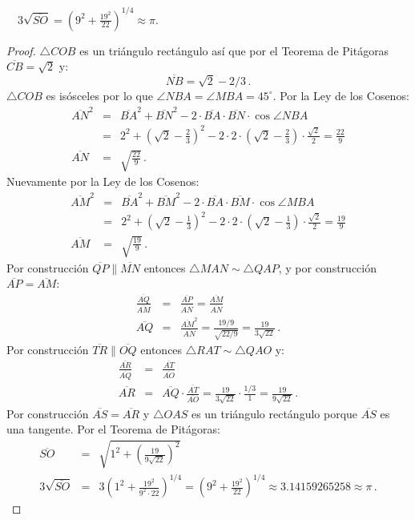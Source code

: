 \begin{theorem}\label{thm.ramanujan2}
$\quad 3\sqrt{\overline{SO}}=\left(9^2+\displaystyle\frac{19^2}{22}\right)^{1/4}\approx \pi$.
\end{theorem}
\begin{proof}
$\triangle COB$ es un triángulo rectángulo así que por el Teorema de Pitágoras $\overline{CB}=\sqrt{2}$ y:
\[
\overline{NB}=\sqrt{2}-2/3\,.
\]
$\triangle COB$ es isósceles por lo que $\angle NBA =\angle MBA=45^\circ$. Por la Ley de los Cosenos:
\begin{eqnarray*}
\overline{AN}^2&=&\overline{BA}^2 + \overline{BN}^2-2\cdot\overline{BA}\cdot\overline{BN}\cdot\cos \angle NBA\\
&=&2^2+\left(\sqrt{2}-\frac{2}{3}\right)^2-2\cdot 2 \cdot \left(\sqrt{2}-\frac{2}{3}\right)\cdot \frac{\sqrt{2}}{2}
=\frac{22}{9}\\
\overline{AN}&=&\sqrt{\frac{22}{9}}\,.
\end{eqnarray*}
Nuevamente por la Ley de los Cosenos:
\begin{eqnarray*}
\overline{AM}^2&=&\overline{BA}^2 + \overline{BM}^2-2\cdot\overline{BA}\cdot\overline{BM}\cdot\cos \angle MBA\\
&=&2^2+\left(\sqrt{2}-\frac{1}{3}\right)^2-2\cdot 2 \cdot \left(\sqrt{2}-\frac{1}{3}\right)\cdot \frac{\sqrt{2}}{2}
=\frac{19}{9}\\
\overline{AM}&=&\sqrt{\frac{19}{9}}\,.
\end{eqnarray*}
Por construcción $\overline{QP}\parallel \overline{MN}$ entonces
$\triangle MAN\sim \triangle QAP$, y por construcción $\overline{AP}=\overline{AM}$:
\begin{eqnarray*}
\frac{\overline{AQ}}{\overline{AM}}&=&\frac{\overline{AP}}{\overline{AN}}=\frac{\overline{AM}}{\overline{AN}}\\
\overline{AQ}&=&\frac{\overline{AM}^2}{\overline{AN}}=\frac{19/9}{\sqrt{22/9}}=\frac{19}{3\sqrt{22}}\,.
\end{eqnarray*}
Por construcción $\overline{TR}\parallel \overline{OQ}$ entonces
$\triangle RAT\sim \triangle QAO$ y:
\begin{eqnarray*}
\frac{\overline{AR}}{\overline{AQ}}&=&\frac{\overline{AT}}{\overline{AO}}\\
\overline{AR}&=&\overline{AQ}\cdot\frac{\overline{AT}}{\overline{AO}}=\frac{19}{3\sqrt{22}}\cdot\frac{1/3}{1}=\frac{19}{9\sqrt{22}}\,.
\end{eqnarray*}
Por construcción $\overline{AS}=\overline{AR}$ y $\triangle OAS$ es un triángulo rectángulo porque $\overline{AS}$ es una tangente. Por el Teorema de Pitágoras:
\begin{eqnarray*}
\overline{SO}&=&\sqrt{1^2+\left(\frac{19}{9\sqrt{22}}\right)^2}\\
3\sqrt{\overline{SO}}&=&3\left(1^2+\frac{19^2}{9^2\cdot 22}\right)^{1/4}=
\left(9^2+\frac{19^2}{22}\right)^{1/4}\approx 3.14159265258\approx\pi\,.
\end{eqnarray*}


\end{proof}
